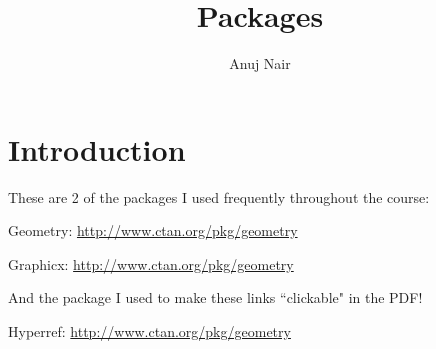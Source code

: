 \documentclass{article}
\title{Packages}
\author{Anuj Nair}
\date{}
\begin{document}
\maketitle

\section{Introduction}
  These are 2 of the packages I used frequently throughout the course:

	Geometry: \url{http://www.ctan.org/pkg/geometry}
	
	Graphicx: \url{http://www.ctan.org/pkg/geometry}
	
	\noindent And the package I used to make these links ``clickable" in the PDF!
	
	Hyperref: \url{http://www.ctan.org/pkg/geometry}
\end{document}
